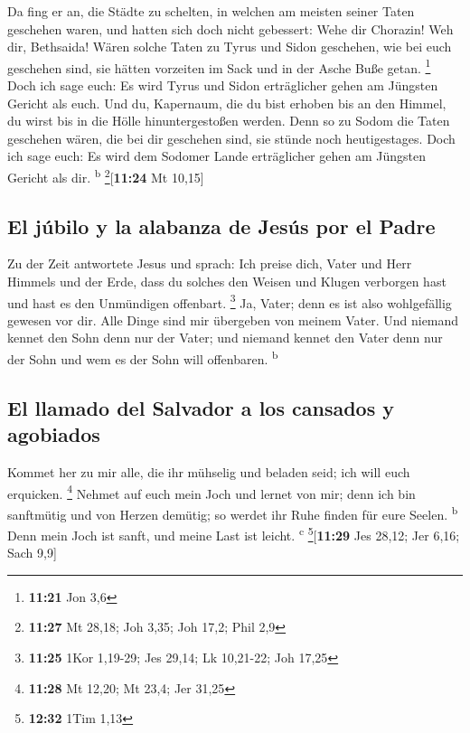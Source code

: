 Da fing er an, die Städte zu schelten, in welchen am
meisten seiner Taten geschehen waren, und hatten sich doch nicht
gebessert:  Wehe dir Chorazin! Weh dir, Bethsaida! Wären
solche Taten zu Tyrus und Sidon geschehen, wie bei euch geschehen sind,
sie hätten vorzeiten im Sack und in der Asche Buße getan. \footnote{\textbf{11:21}
  Jon 3,6}  Doch ich sage euch: Es wird Tyrus und Sidon
erträglicher gehen am Jüngsten Gericht als euch.  Und du,
Kapernaum, die du bist erhoben bis an den Himmel, du wirst bis in die
Hölle hinuntergestoßen werden. Denn so zu Sodom die Taten geschehen
wären, die bei dir geschehen sind, sie stünde noch heutigestages.
 Doch ich sage euch: Es wird dem Sodomer Lande
erträglicher gehen am Jüngsten Gericht als dir. \textsuperscript{b}
\footnote{\textbf{11:27} Mt 28,18; Joh 3,35; Joh 17,2; Phil 2,9}{[}\textbf{11:24}
Mt 10,15{]}

\hypertarget{el-juxfabilo-y-la-alabanza-de-jesuxfas-por-el-padre}{%
\subsection{El júbilo y la alabanza de Jesús por el
Padre}\label{el-juxfabilo-y-la-alabanza-de-jesuxfas-por-el-padre}}

 Zu der Zeit antwortete Jesus und sprach: Ich preise
dich, Vater und Herr Himmels und der Erde, dass du solches den Weisen
und Klugen verborgen hast und hast es den Unmündigen offenbart.
\footnote{\textbf{11:25} 1Kor 1,19-29; Jes 29,14; Lk 10,21-22; Joh 17,25}
 Ja, Vater; denn es ist also wohlgefällig gewesen vor
dir.  Alle Dinge sind mir übergeben von meinem Vater. Und
niemand kennet den Sohn denn nur der Vater; und niemand kennet den Vater
denn nur der Sohn und wem es der Sohn will offenbaren.
\textsuperscript{b}

\hypertarget{el-llamado-del-salvador-a-los-cansados-y-agobiados}{%
\subsection{El llamado del Salvador a los cansados
\hspace{0pt}\hspace{0pt}y
agobiados}\label{el-llamado-del-salvador-a-los-cansados-y-agobiados}}

 Kommet her zu mir alle, die ihr mühselig und beladen
seid; ich will euch erquicken. \footnote{\textbf{11:28} Mt 12,20; Mt
  23,4; Jer 31,25}  Nehmet auf euch mein Joch und lernet
von mir; denn ich bin sanftmütig und von Herzen demütig; so werdet ihr
Ruhe finden für eure Seelen. \textsuperscript{b}  Denn
mein Joch ist sanft, und meine Last ist leicht. \textsuperscript{c}
\footnote{\textbf{12:32} 1Tim 1,13}{[}\textbf{11:29} Jes 28,12; Jer
6,16; Sach 9,9{]}

